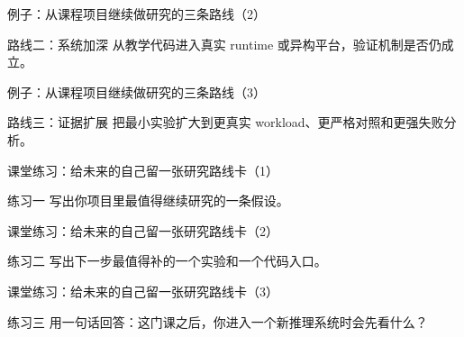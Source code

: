 \begin{frame}{例子：从课程项目继续做研究的三条路线（2）}
\begin{block}{路线二：系统加深}
    从教学代码进入真实 runtime 或异构平台，验证机制是否仍成立。
  \end{block}
\end{frame}

\begin{frame}{例子：从课程项目继续做研究的三条路线（3）}
\begin{block}{路线三：证据扩展}
    把最小实验扩大到更真实 workload、更严格对照和更强失败分析。
  \end{block}
\end{frame}

\begin{frame}{课堂练习：给未来的自己留一张研究路线卡（1）}
\begin{block}{练习一}
    写出你项目里最值得继续研究的一条假设。
  \end{block}
\end{frame}

\begin{frame}{课堂练习：给未来的自己留一张研究路线卡（2）}
\begin{block}{练习二}
    写出下一步最值得补的一个实验和一个代码入口。
  \end{block}
\end{frame}

\begin{frame}{课堂练习：给未来的自己留一张研究路线卡（3）}
\begin{block}{练习三}
    用一句话回答：这门课之后，你进入一个新推理系统时会先看什么？
  \end{block}
\end{frame}
